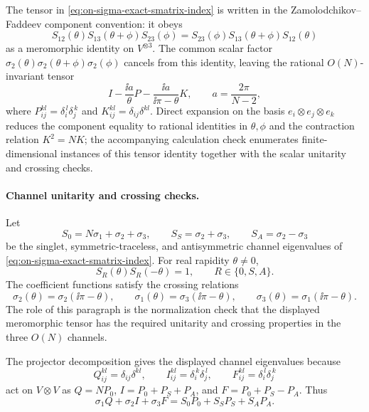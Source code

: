 The tensor in \eqref{eq:on-sigma-exact-smatrix-index} is written in the
Zamolodchikov--Faddeev component convention: it obeys
\[
  S_{12}(\theta)S_{13}(\theta+\phi)S_{23}(\phi)
  =
  S_{23}(\phi)S_{13}(\theta+\phi)S_{12}(\theta)
\]
as a meromorphic identity on \(V^{\otimes3}\).  The common scalar factor
\(\sigma_2(\theta)\sigma_2(\theta+\phi)\sigma_2(\phi)\) cancels from this
identity, leaving the rational \(O(N)\)-invariant tensor
\[
  I-\frac{\ii a}{\theta}P-\frac{\ii a}{\ii\pi-\theta}K,\qquad
  a=\frac{2\pi}{N-2},
\]
where \(P_{ij}^{kl}=\delta_i^{\,l}\delta_j^{\,k}\) and
\(K_{ij}^{kl}=\delta_{ij}\delta^{kl}\).  Direct expansion on the basis
\(e_i\otimes e_j\otimes e_k\) reduces the component equality to rational
identities in \(\theta,\phi\) and the contraction relation \(K^2=NK\);
the accompanying calculation check enumerates finite-dimensional instances of
this tensor identity together with the scalar unitarity and crossing checks.

\paragraph{Channel unitarity and crossing checks.}
Let
\[
  S_0=N\sigma_1+\sigma_2+\sigma_3,\qquad
  S_S=\sigma_2+\sigma_3,\qquad
  S_A=\sigma_2-\sigma_3
\]
be the singlet, symmetric-traceless, and antisymmetric channel eigenvalues of
\eqref{eq:on-sigma-exact-smatrix-index}.  For real rapidity \(\theta\neq0\),
\[
  S_R(\theta)S_R(-\theta)=1,\qquad R\in\{0,S,A\}.
\]
The coefficient functions satisfy the crossing relations
\[
  \sigma_2(\theta)=\sigma_2(\ii\pi-\theta),
  \qquad
  \sigma_1(\theta)=\sigma_3(\ii\pi-\theta),
  \qquad
  \sigma_3(\theta)=\sigma_1(\ii\pi-\theta).
\]
The role of this paragraph is the normalization check that the displayed
meromorphic tensor has the required unitarity and crossing properties in the
three \(O(N)\) channels.

The projector decomposition gives the displayed channel eigenvalues because
\[
  Q_{ij}^{kl}=\delta_{ij}\delta^{kl},\qquad
  I_{ij}^{kl}=\delta_i^{\,k}\delta_j^{\,l},\qquad
  F_{ij}^{kl}=\delta_i^{\,l}\delta_j^{\,k}
\]
act on \(V\otimes V\) as \(Q=NP_0\), \(I=P_0+P_S+P_A\), and
\(F=P_0+P_S-P_A\).  Thus
\[
  \sigma_1Q+\sigma_2I+\sigma_3F
  =
  S_0P_0+S_SP_S+S_AP_A .
\]

